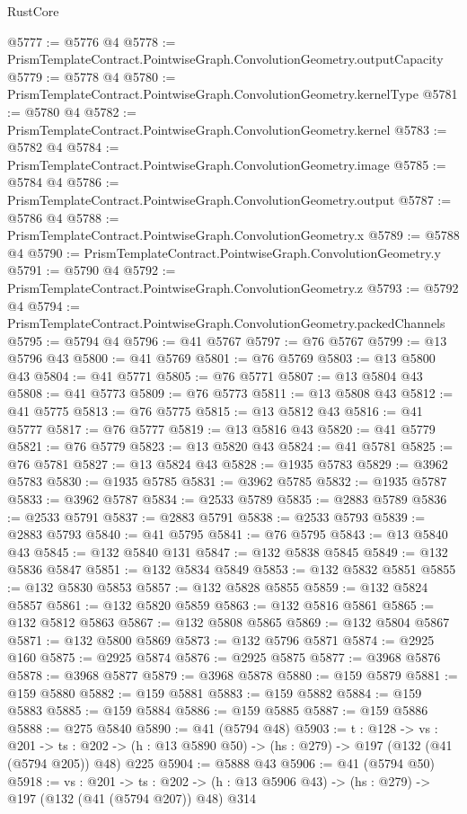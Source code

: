 \begin{lexlean}{RustCore}
\begin{coremodule}
@5777 := @5776 @4
@5778 := PrismTemplateContract.PointwiseGraph.ConvolutionGeometry.outputCapacity
@5779 := @5778 @4
@5780 := PrismTemplateContract.PointwiseGraph.ConvolutionGeometry.kernelType
@5781 := @5780 @4
@5782 := PrismTemplateContract.PointwiseGraph.ConvolutionGeometry.kernel
@5783 := @5782 @4
@5784 := PrismTemplateContract.PointwiseGraph.ConvolutionGeometry.image
@5785 := @5784 @4
@5786 := PrismTemplateContract.PointwiseGraph.ConvolutionGeometry.output
@5787 := @5786 @4
@5788 := PrismTemplateContract.PointwiseGraph.ConvolutionGeometry.x
@5789 := @5788 @4
@5790 := PrismTemplateContract.PointwiseGraph.ConvolutionGeometry.y
@5791 := @5790 @4
@5792 := PrismTemplateContract.PointwiseGraph.ConvolutionGeometry.z
@5793 := @5792 @4
@5794 := PrismTemplateContract.PointwiseGraph.ConvolutionGeometry.packedChannels
@5795 := @5794 @4
@5796 := @41 @5767
@5797 := @76 @5767
@5799 := @13 @5796 @43
@5800 := @41 @5769
@5801 := @76 @5769
@5803 := @13 @5800 @43
@5804 := @41 @5771
@5805 := @76 @5771
@5807 := @13 @5804 @43
@5808 := @41 @5773
@5809 := @76 @5773
@5811 := @13 @5808 @43
@5812 := @41 @5775
@5813 := @76 @5775
@5815 := @13 @5812 @43
@5816 := @41 @5777
@5817 := @76 @5777
@5819 := @13 @5816 @43
@5820 := @41 @5779
@5821 := @76 @5779
@5823 := @13 @5820 @43
@5824 := @41 @5781
@5825 := @76 @5781
@5827 := @13 @5824 @43
@5828 := @1935 @5783
@5829 := @3962 @5783
@5830 := @1935 @5785
@5831 := @3962 @5785
@5832 := @1935 @5787
@5833 := @3962 @5787
@5834 := @2533 @5789
@5835 := @2883 @5789
@5836 := @2533 @5791
@5837 := @2883 @5791
@5838 := @2533 @5793
@5839 := @2883 @5793
@5840 := @41 @5795
@5841 := @76 @5795
@5843 := @13 @5840 @43
@5845 := @132 @5840 @131
@5847 := @132 @5838 @5845
@5849 := @132 @5836 @5847
@5851 := @132 @5834 @5849
@5853 := @132 @5832 @5851
@5855 := @132 @5830 @5853
@5857 := @132 @5828 @5855
@5859 := @132 @5824 @5857
@5861 := @132 @5820 @5859
@5863 := @132 @5816 @5861
@5865 := @132 @5812 @5863
@5867 := @132 @5808 @5865
@5869 := @132 @5804 @5867
@5871 := @132 @5800 @5869
@5873 := @132 @5796 @5871
@5874 := @2925 @160
@5875 := @2925 @5874
@5876 := @2925 @5875
@5877 := @3968 @5876
@5878 := @3968 @5877
@5879 := @3968 @5878
@5880 := @159 @5879
@5881 := @159 @5880
@5882 := @159 @5881
@5883 := @159 @5882
@5884 := @159 @5883
@5885 := @159 @5884
@5886 := @159 @5885
@5887 := @159 @5886
@5888 := @275 @5840
@5890 := @41 (@5794 @48)
@5903 := {t : @128} ->
  {vs : @201} ->
  {ts : @202} -> (h : @13 @5890 @50) -> (hs : @279) -> @197 (@132 (@41 (@5794 @205)) @48) @225
@5904 := @5888 @43
@5906 := @41 (@5794 @50)
@5918 := {vs : @201} ->
  {ts : @202} -> (h : @13 @5906 @43) -> (hs : @279) -> @197 (@132 (@41 (@5794 @207)) @48) @314

\end{coremodule}
\end{lexlean}

